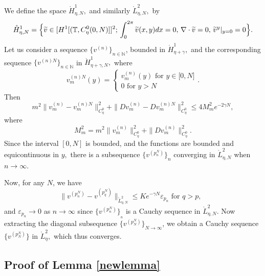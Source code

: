 \documentclass[11pt]{article}
\begin{document}
We define the space $\mathring{H}_{\eta,N}^{1},$ and similarly $\mathring{L}%
_{\eta,N}^{2},$ by%
\begin{eqnarray*}
\mathring{H}_{\eta,N}^{1} =\Bigl\{ \widetilde{v}\in \lbrack H^{1}[(\mathbb{T},C_{\eta}^{0}(0,N)]]^{2}; \,
\int_{0}^{2\pi }\widetilde{v}(x,y)dx=0, \, \nabla \cdot \widetilde{v}=0,%
\, \widetilde{v}^{y}|_{y=0}=0\Bigr\} .
\end{eqnarray*}%
Let us consider a sequence $\{v^{(n)}\}_{n\in \mathbb{N}}$, bounded in $%
\mathring{H}_{\eta+\gamma }^{1},$ and the corresponding sequence $%
\{v^{(n)N}\}_{n\in \mathbb{N}}$ in $\mathring{H}_{\eta+\gamma ,N}^{1},$ where%
\begin{equation*}
v_{m}^{(n)N}(y)=\left\{ 
\begin{array}{c}
v_{m}^{(n)}(y)\text{ for }y\in \lbrack 0,N] \\ 
0\text{ for }y>N%
\end{array}%
\right. .
\end{equation*}%
Then%
\begin{equation*}
m^{2}\|v_{m}^{(n)}-v_{m}^{(n)N}\|_{C_{\eta}^{0}}^{2}+\|Dv_{m}^{(n)}-Dv_{m}^{(n)N}\|_{C_{\eta}^{0}}^{2}\leq 4M_{m}^{2}e^{-2\gamma N},
\end{equation*}%
where 
\begin{equation*}
M_{m}^{2}=m^{2}\|v_{m}^{(n)}\|_{C_{\eta}^{0}}^{2}+\|Dv_{m}^{(n)}\|_{C_{\eta}^{0}}^{2}.
\end{equation*}%
Since the interval $[0,N]$ is bounded, and the functions are bounded and
equicontinuous in $y,$ there is a subsequence $\{v^{(p_{n}^{N})}\}_{n}$
converging in $\mathring{L}_{\eta,N}^{2}$ when $n\rightarrow \infty .$

Now, for any $N$, we have%
\begin{equation*}
\|v^{(p_{n}^{N})}-v^{(p_{q}^{N})}\|_{\mathring{L}_{\eta,N}^{2}}\leq Ke^{-\gamma
N}\varepsilon _{p_{n}}\text{ for }q>p,\text{ }
\end{equation*}%
and $\varepsilon _{p_{n}}\rightarrow 0$ as $n\rightarrow \infty $ since $%
\{v^{(p_{n}^{N})}\}_{_{n}}$ is a Cauchy sequence in $\mathring{L}_{\eta,N}^{2}$. 
Now extracting the diagonal subsequence $\{v^{(p_{N}^{N})}\}_{N\rightarrow
\infty }$, we obtain a Cauchy sequence $\{v^{(p_{N}^{N})}\}$ in $\mathring{L}%
_{\eta}^{2},$ which thus converges. 





\subsection{Proof of Lemma \ref{newlemma}
\label{newappendix}}
\end{document}
